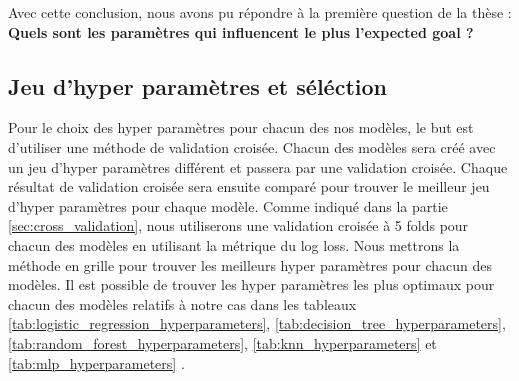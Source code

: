 \documentclass[12pt]{article}
\begin{document}
Avec cette conclusion, nous avons pu répondre à la première question de la thèse : \newline\textbf{Quels sont les paramètres qui influencent le plus l’expected goal ?}


\subsection{Jeu d'hyper paramètres et séléction}
Pour le choix des hyper paramètres pour chacun des nos modèles, le but est d'utiliser une méthode de validation croisée.
Chacun des modèles sera créé avec un jeu d'hyper paramètres différent et passera par une validation croisée.
Chaque résultat de validation croisée sera ensuite comparé pour trouver le meilleur jeu d'hyper paramètres pour chaque modèle.
Comme indiqué dans la partie \ref{sec:cross_validation}, nous utiliserons une validation croisée à 5 folds pour chacun des modèles en utilisant la métrique du log loss.
Nous mettrons la méthode en grille pour trouver les meilleurs hyper paramètres pour chacun des modèles.
Il est possible de trouver les hyper paramètres les plus optimaux pour chacun des modèles relatifs à notre cas dans les tableaux \ref{tab:logistic_regression_hyperparameters}, \ref{tab:decision_tree_hyperparameters}, \ref{tab:random_forest_hyperparameters}, \ref{tab:knn_hyperparameters} et \ref{tab:mlp_hyperparameters} .
\end{document}
